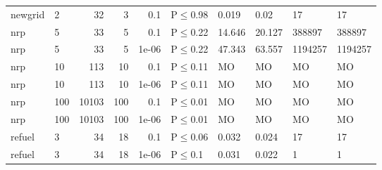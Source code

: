 \begin{longtable}{llrrrlllll}
 newgrid       & 2         &     	32 &   3 & 0.1   & P$\leq$0.98  & 0.019  & 0.02   & 17      & 17      \\
 nrp           & 5         &     	33 &   5 & 0.1   & P$\leq$0.22  & 14.646 & 20.127 & 388897  & 388897  \\
 nrp           & 5         &     	33 &   5 & 1e-06 & P$\leq$0.22  & 47.343 & 63.557 & 1194257 & 1194257 \\
 nrp           & 10        &    	113 &  10 & 0.1   & P$\leq$0.11  & MO     & MO     & MO      & MO      \\
 nrp           & 10        &    	113 &  10 & 1e-06 & P$\leq$0.11  & MO     & MO     & MO      & MO      \\
 nrp           & 100       &  	10103 & 100 & 0.1   & P$\leq$0.01  & MO     & MO     & MO      & MO      \\
 nrp           & 100       &  	10103 & 100 & 1e-06 & P$\leq$0.01  & MO     & MO     & MO      & MO      \\
 refuel        & 3         &     	34 &  18 & 0.1   & P$\leq$0.06  & 0.032  & 0.024  & 17      & 17      \\
 refuel        & 3         &     	34 &  18 & 1e-06 & P$\leq$0.1   & 0.031  & 0.022  & 1       & 1       \\
\bottomrule
\end{longtable}
